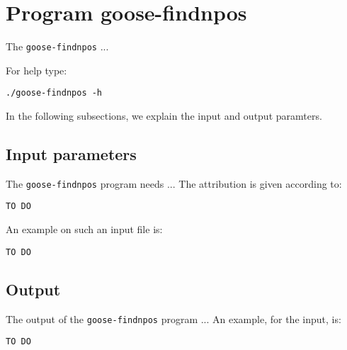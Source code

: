 \section{Program goose-findnpos}
The \texttt{goose-findnpos} ...

For help type:
\begin{lstlisting}
./goose-findnpos -h
\end{lstlisting}
In the following subsections, we explain the input and output paramters.

\subsection*{Input parameters}

The \texttt{goose-findnpos} program needs ...
The attribution is given according to:
\begin{lstlisting}
TO DO
\end{lstlisting}

An example on such an input file is:
\begin{lstlisting}
TO DO
\end{lstlisting}

\subsection*{Output}
The output of the \texttt{goose-findnpos} program ...
An example, for the input, is:
\begin{lstlisting}
TO DO
\end{lstlisting}

